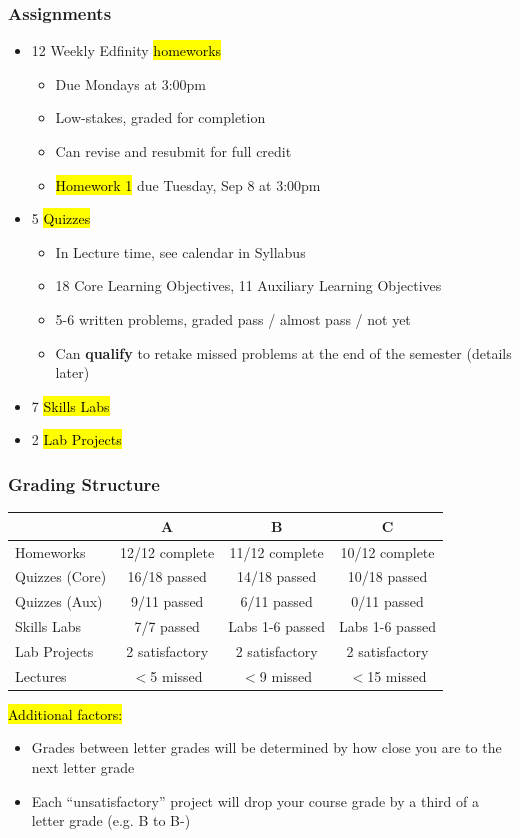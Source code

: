 \documentclass[11pt,containsverbatim,handout]{beamer}
\begin{document}
\begin{frame}
	\frametitle{Assignments}
	\begin{itemize}
		\item 12 Weekly Edfinity \hl{homeworks}
		\begin{itemize}
			\item Due Mondays at 3:00pm
			\item Low-stakes, graded for completion
			\item Can revise and resubmit for full credit
			\item \hl{Homework 1} due Tuesday, Sep 8 at 3:00pm
		\end{itemize} 
		\item 5 \hl{Quizzes} 
		\begin{itemize} %
			\item In Lecture time, see calendar in Syllabus
			\item 18 Core Learning Objectives, 11 Auxiliary Learning Objectives
			\item 5-6 written problems, graded pass / almost pass / not yet
			\item Can \textbf{qualify} to retake missed problems at the end of the semester (details later)
		\end{itemize}
		\item 7 \hl{Skills Labs}
		\item 2 \hl{Lab Projects}
	\end{itemize}
\end{frame}

\begin{frame}
	\frametitle{Grading Structure} %
	\begin{table}[ht]
	\centering
	\small
	\begin{tabular}{|l|c|c|c|}
	\hline
	 & \textbf{A} & \textbf{B} & \textbf{C} \\
	\hline
	Homeworks & 12/12 complete & 11/12 complete & 10/12 complete \\
	\hline
	Quizzes (Core) & 16/18 passed & 14/18 passed & 10/18 passed \\
	\hline
	Quizzes (Aux) & 9/11 passed & 6/11 passed & 0/11 passed \\
	\hline
	Skills Labs & 7/7 passed & Labs 1-6 passed & Labs 1-6 passed \\
	\hline
	Lab Projects & 2 satisfactory & 2 satisfactory & 2 satisfactory \\
	\hline
	Lectures & $<$5 missed & $<$9 missed & $<$15 missed \\
	\hline
	\end{tabular}
	\end{table}

	\hl{Additional factors:}
	\begin{itemize}
		\item Grades between letter grades will be determined by how close you are to the next letter grade
		\item Each ``unsatisfactory'' project will drop your course grade by a third of a letter grade (e.g. B to B-)
	\end{itemize}
\end{frame}
\end{document}
